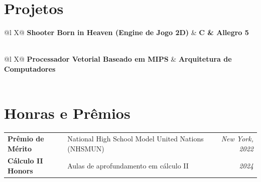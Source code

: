 \documentclass[a4paper,12pt]{article}
\begin{document}
\section{Projetos}

\begin{tabularx}{\linewidth}{@{}l X@{}}
\textbf{Shooter Born in Heaven (Engine de Jogo 2D)} & \hfill \textbf{C \& Allegro 5} \\
 \\
\end{tabularx}

\vspace{0.5em} %

\begin{tabularx}{\linewidth}{@{}l X@{}}
\textbf{Processador Vetorial Baseado em MIPS} & \hfill \textbf{Arquitetura de Computadores} \\
 \\
\end{tabularx}

\section{Honras e Prêmios}

\begin{tabularx}{\linewidth}{@{}l X r@{}}
\textbf{Prêmio de Mérito} & National High School Model United Nations (NHSMUN) & \textit{New York, 2022} \\
\textbf{Cálculo II Honors} & Aulas de aprofundamento em cálculo II & \textit{2024} \\
\end{tabularx}

\end{document}
